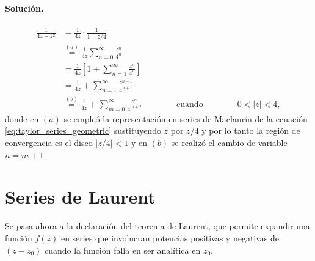 \documentclass[a4paper]{report}
\begin{document}
\paragraph{Solución.} 
\begin{align*}
 \frac{1}{4z-z^2}&=\frac{1}{4z}\cdot\frac{1}{1-z/4}\\
  &\overset{(a)}{=}\frac{1}{4z}\sum_{n=0}^\infty\frac{z^n}{4^n}\\
  &=\frac{1}{4z}\left[1+\sum_{n=1}^\infty\frac{z^n}{4^n}\right]\\
  &=\frac{1}{4z}+\sum_{n=1}^\infty\frac{z^{n-1}}{4^{n+1}}\\
  &\overset{(b)}{=}\frac{1}{4z}+\sum_{m=0}^\infty\frac{z^m}{4^{m+2}}
  \qquad\qquad\textrm{cuando}\qquad\qquad
  0<|z|<4,
\end{align*}
donde en \((a)\) se empleó la representación en series de Maclaurin de la ecuación \ref{eq:taylor_series_geometric} sustituyendo \(z\) por \(z/4\) y por lo tanto la región de convergencia es el disco \(|z/4|<1\) y en \((b)\) se realizó el cambio de variable \(n=m+1\).
 
\section{Series de Laurent}\label{sec:laurent_series} 
 
Se pasa ahora a la declaración del teorema de Laurent, que permite expandir una función \(f(z)\) en series que involucran potencias positivas y negativas de \((z-z_0)\) cuando la función falla en ser analítica en \(z_0\). 
 
\end{document}
